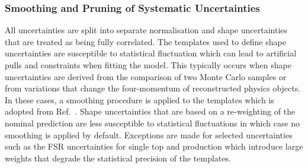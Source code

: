 


%


\subsubsection{Smoothing and Pruning of Systematic Uncertainties}

All uncertainties are split into separate normalisation and shape uncertainties
that are treated as being fully correlated. The templates used to define shape
uncertainties are susceptible to statistical fluctuation which can lead to
artificial pulls and constraints when fitting the model. This typically occurs
when shape uncertainties are derived from the comparison of two Monte Carlo
samples or from variations that change the four-momentum of reconstructed
physics objects. In these cases, a smoothing procedure is applied to the
templates which is adopted from Ref.~\cite{HIGG-2013-23}. Shape uncertainties
that are based on a re-weighting of the nominal prediction are less susceptible
to statistical fluctuations in which case no smoothing is applied by
default. Exceptions are made for selected uncertainties such as the FSR
uncertainties for single top and \ttbar production which introduce large weights
that degrade the statistical precision of the templates.

